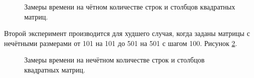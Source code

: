 \begin{figure}[H]
\caption{Замеры времени на чётном количестве строк и столбцов квадратных матриц.}
\label{fig:t_even}
\end{figure}

Второй эксперимент производится для худшего случая, когда заданы матрицы с нечётными размерами от 101 на 101 до 501 на 501 с шагом 100. Рисунок \ref{fig:t}.

\begin{figure}[H]
\caption{Замеры времени на нечётном количестве строк и столбцов квадратных матриц.}
\label{fig:t}
\end{figure}

